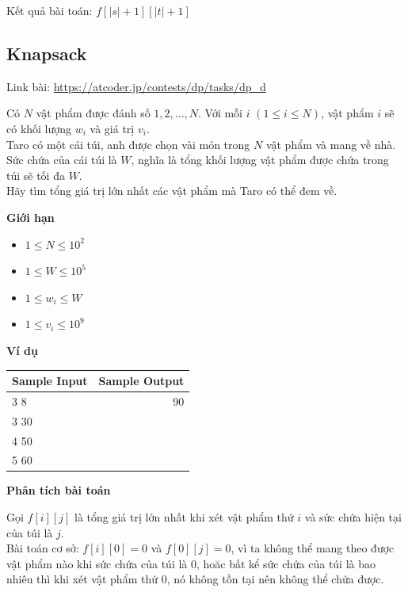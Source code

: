 \documentclass{article}
\begin{document}
Kết quả bài toán: $f[|s| + 1][|t| + 1]$
\subsection{Knapsack}
Link bài: \url{https://atcoder.jp/contests/dp/tasks/dp_d}

\begin{tcolorbox}[
    colback=blue!5,        %
    colframe=blue!75!black,%
    title={Đề bài}
]
Có $N$ vật phẩm được đánh số $1, 2, ..., N$. Với mỗi $i$ $(1 \leq i \leq N)$, vật phẩm $i$ sẽ có khối lượng $w_i$ và giá trị $v_i$.\\
Taro có một cái túi, anh được chọn vài món trong $N$ vật phẩm và mang về nhà. Sức chứa của cái túi là $W$, nghĩa là tổng khối lượng vật phẩm được chứa trong túi sẽ tối đa $W$.\\
Hãy tìm tổng giá trị lớn nhất các vật phẩm mà Taro có thể đem về.
\end{tcolorbox}

\textbf{Giới hạn}
\begin{itemize}
    \item $1 \leq N \leq 10^2$
    \item $1 \leq W \leq 10^5$
    \item $1 \leq w_i \leq W$
    \item $1 \leq v_i \leq 10^9$
\end{itemize}

\textbf{Ví dụ}

\begin{table}[h]
    \centering
    \begin{tabular}{|l|r|}
        \hline
        \textbf{Sample Input} & \textbf{Sample Output} \\
        \hline
		3 8& 90\\ 
		3 30&  \\
        4 50& \\
        5 60& \\ 
		\hline
    \end{tabular}
\end{table}

\textbf{Phân tích bài toán}

Gọi \(f[i][j]\) là tổng giá trị lớn nhất khi xét vật phẩm thứ $i$ và sức chứa hiện tại của túi là $j$. \\

Bài toán cơ sở: $f[i][0] = 0$ và $f[0][j] = 0$, vì ta không thể mang theo được vật phẩm nào khi sức chứa của túi là 0, hoăc bất kể sức chứa của túi là bao nhiêu thì khi xét vật phẩm thứ 0, nó không tồn tại nên không thể chứa được. \\
\end{document}
